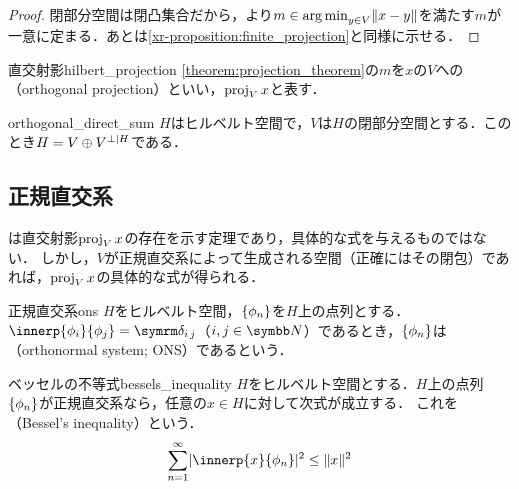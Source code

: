 \documentclass[../../main]{subfiles}
\begin{document}
\begin{proof}
  閉部分空間は閉凸集合だから，より\(m\in\operatorname*{arg\,min}_{y\in V}\lVert x-y\rVert\)を満たす\(m\)が一意に定まる．あとは\cref{xr-proposition:finite_projection}と同様に示せる．
\end{proof}

\begin{definition}{直交射影}{hilbert_projection}
  \cref{theorem:projection_theorem}の\(m\)を\(x\)の\(V\)への（orthogonal projection）といい，\(\operatorname{proj}_Vx\)と表す．
\end{definition}

\begin{proposition}{}{orthogonal_direct_sum}
  \(H\)はヒルベルト空間で，\(V\)は\(H\)の閉部分空間とする．このとき\(H=V\oplus\pcomp[H]{V}\)である．
\end{proposition}

\subsection{正規直交系}

は直交射影\(\operatorname{proj}_Vx\)の存在を示す定理であり，具体的な式を与えるものではない．
しかし，\(V\)が正規直交系によって生成される空間（正確にはその閉包）であれば，\(\operatorname{proj}_Vx\)の具体的な式が得られる．

\begin{definition}{正規直交系}{ons}
  \(H\)をヒルベルト空間，\(\lbrace\phi_n\rbrace\)を\(H\)上の点列とする．\(\innerp{\phi_i}{\phi_j}=\kdelta{i}{j}\)（\(i,j\in\numset{N}\)）であるとき，\(\lbrace\phi_n\rbrace\)は（orthonormal system; ONS）であるという．
\end{definition}

\begin{theorem}{ベッセルの不等式}{bessels_inequality}
  \(H\)をヒルベルト空間とする．\(H\)上の点列\(\lbrace\phi_n\rbrace\)が正規直交系なら，任意の\(x\in H\)に対して次式が成立する．
  これを（Bessel's inequality）という．
  \begin{equation}
    \label{equation:bessels_inequality}
    \sum_{n=1}^\infty\abs{\innerp{x}{\phi_n}}^2 \leq \vnorm{x}^2
  \end{equation}
\end{theorem}
\end{document}
